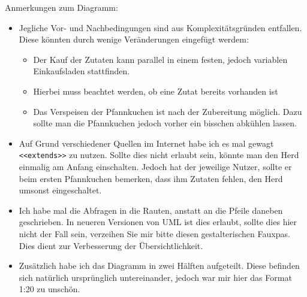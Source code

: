\documentclass{article}
\begin{document}
    \newpage
    Anmerkungen zum Diagramm:
    \begin{itemize}
        \item Jegliche Vor- und Nachbedingungen sind aus Komplexitätsgründen entfallen.
            Diese könnten durch wenige Veränderungen eingefügt werdem:
            \begin{itemize}
                \item Der Kauf der Zutaten kann parallel in einem festen, jedoch variablen Einkaufsladen stattfinden.
                \item Hierbei muss beachtet werden, ob eine Zutat bereits vorhanden ist
                \item Das Verspeisen der Pfannkuchen ist nach der Zubereitung möglich.
                    Dazu sollte man die Pfannkuchen jedoch vorher ein bisschen abkühlen lassen.
            \end{itemize} 
        \item Auf Grund verschiedener Quellen im Internet habe ich es mal gewagt \texttt{<<extends>>} zu nutzen.
            Sollte dies nicht erlaubt sein, könnte man den Herd einmalig am Anfang einschalten.
            Jedoch hat der jeweilige Nutzer, sollte er beim ersten Pfannkuchen bemerken, dass ihm Zutaten fehlen, den Herd umsonst eingeschaltet.
        \item Ich habe mal die Abfragen in die Rauten, anstatt an die Pfeile daneben geschrieben.
            In neueren Versionen von UML ist dies erlaubt, sollte dies hier nicht der Fall sein, verzeihen Sie mir bitte diesen gestalterischen Fauxpas.
            Dies dient zur Verbesserung der Übersichtlichkeit.
        \item Zusätzlich habe ich das Diagramm in zwei Hälften aufgeteilt.
            Diese befinden sich natürlich ursprünglich untereinander, jedoch war mir hier das Format 1:20 zu unschön.
    \end{itemize}
\end{document}
